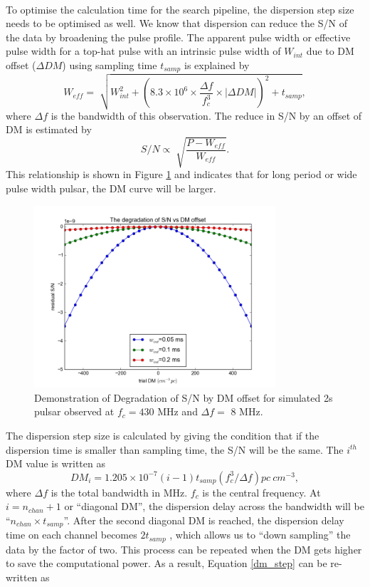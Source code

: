 \documentclass[thesis_msc.tex]{subfiles}
\begin{document}
        \paragraph{} To optimise the calculation time for the search pipeline, the dispersion step size needs to be optimised as well. We know that dispersion can reduce the S/N of the data by broadening the pulse profile. The apparent pulse width or effective pulse width for a top-hat pulse with an intrinsic pulse width of $W_{int}$ due to DM offset ($\Delta DM$) using sampling time $t_{samp}$ is explained by
        \begin{equation}
        W_{eff}=\sqrt[]{W_{int}^2+(8.3 \times 10^6 \times \frac{\Delta f}{f_c^3} \times |\Delta DM|)^2+t_{samp}},
        \end{equation}
 where $\Delta f$ is the bandwidth of this observation. The reduce in S/N by an offset of DM is estimated by 
        \begin{equation}
        S/N \propto \sqrt[]{\frac{P-W_{eff}}{W_{eff}}}.
        \end{equation}
        This relationship is shown in Figure \ref{DMcurve} and indicates that for long period or wide pulse width pulsar, the DM curve will be larger.       
                 \begin{figure}[h]
\centering
\includegraphics[width=0.80\textwidth]{figures/DMcurve-title.png}
\caption{Demonstration of Degradation of S/N by DM offset for  simulated 2s pulsar observed at $f_c= 430$ MHz and $\Delta f=$ 8 MHz.}
\label{DMcurve}
\end{figure}
        The dispersion step size is calculated by giving the condition that if the dispersion time is smaller than sampling time, the S/N will be the same. The $i^{th}$ DM value is written as 
        \begin{equation} \label{dm_step}
        DM_i=1.205\times10^{-7}  (i-1)t_{samp}(f_c^3/\Delta f) pc~cm^{-3},
        \end{equation}        
where $\Delta f$ is the total bandwidth in MHz. $f_c$ is the central frequency. At $i=n_{chan}+1$ or ``diagonal DM'', the dispersion delay across the bandwidth will be ``$n_{chan} \times t_{samp}$''. After the second diagonal DM is reached, the dispersion delay time on each channel becomes $2 t_{samp}$ , which allows us to ``down sampling'' the data by the factor of two. This process can be repeated when the DM gets higher to save the computational power. As a result, Equation \ref{dm_step} can be re-written as 
        
\end{document}
